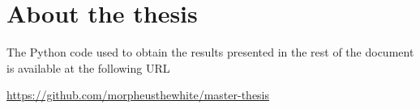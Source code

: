 \section{About the thesis}
\label{sec:about-thesis}

The Python code used to obtain the results presented in the rest of the
document is available at the following URL

\begin{center}
	\url{https://github.com/morpheusthewhite/master-thesis}
\end{center}
